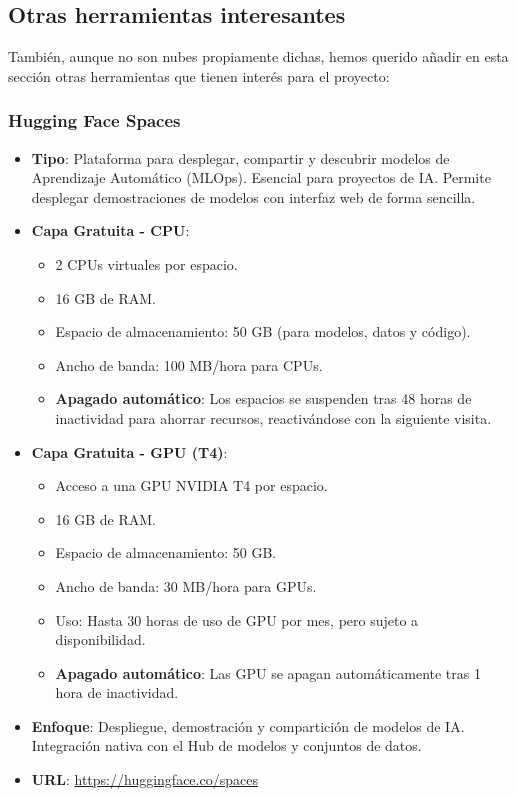 \subsection{Otras herramientas interesantes}
\label{sec:EstudiosNubesOtrasHerramientas}

También, aunque no son nubes propiamente dichas, hemos querido añadir en esta sección otras herramientas que tienen interés para el proyecto:

\subsubsection*{Hugging Face Spaces}
\begin{itemize}
	\item \textbf{Tipo}: Plataforma para desplegar, compartir y descubrir modelos de Aprendizaje Automático (MLOps). Esencial para proyectos de IA. Permite desplegar demostraciones de modelos con interfaz web de forma sencilla.
	\item \textbf{Capa Gratuita - CPU}: 
	\begin{itemize}
		\item 2 CPUs virtuales por espacio.
		\item 16 GB de RAM.
		\item Espacio de almacenamiento: 50 GB (para modelos, datos y código).
		\item Ancho de banda: 100 MB/hora para CPUs.
		\item \textbf{Apagado automático}: Los espacios se suspenden tras 48 horas de inactividad para ahorrar recursos, reactivándose con la siguiente visita.
	\end{itemize}
	\item \textbf{Capa Gratuita - GPU (T4)}: 
	\begin{itemize}
		\item Acceso a una GPU NVIDIA T4 por espacio.
		\item 16 GB de RAM.
		\item Espacio de almacenamiento: 50 GB.
		\item Ancho de banda: 30 MB/hora para GPUs.
		\item Uso: Hasta 30 horas de uso de GPU por mes, pero sujeto a disponibilidad.
		\item \textbf{Apagado automático}: Las GPU se apagan automáticamente tras 1 hora de inactividad.
	\end{itemize}
	\item \textbf{Enfoque}: Despliegue, demostración y compartición de modelos de IA. Integración nativa con el Hub de modelos y conjuntos de datos.
	\item \textbf{URL}: \url{https://huggingface.co/spaces}
\end{itemize}


